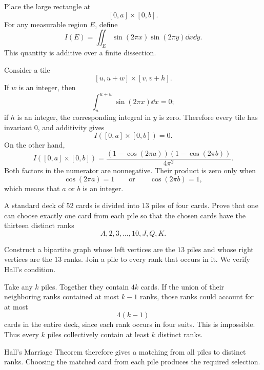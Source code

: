     \begin{solution}
        Place the large rectangle at
        \[
            [0,a]\times[0,b].
        \]
        For any measurable region $E$, define
        \[
            I(E)
            =
            \iint_E
            \sin(2\pi x)\sin(2\pi y)\dd x\dd y.
        \]
        This quantity is additive over a finite dissection.

        Consider a tile
        \[
            [u,u+w]\times[v,v+h].
        \]
        If $w$ is an integer, then
        \[
            \int_u^{u+w}\sin(2\pi x)\dd x=0;
        \]
        if $h$ is an integer, the corresponding integral in $y$ is zero.
        Therefore every tile has invariant $0$, and additivity gives
        \[
            I([0,a]\times[0,b])=0.
        \]
        On the other hand,
        \[
            I([0,a]\times[0,b])
            =
            \frac{(1-\cos(2\pi a))(1-\cos(2\pi b))}{4\pi^2}.
        \]
        Both factors in the numerator are nonnegative. Their product is zero
        only when
        \[
            \cos(2\pi a)=1
            \qquad\text{or}\qquad
            \cos(2\pi b)=1,
        \]
        which means that $a$ or $b$ is an integer.
    \end{solution}

    \begin{expectedproblem}
        A standard deck of $52$ cards is divided into $13$ piles of four cards.
        Prove that one can choose exactly one card from each pile so that the
        chosen cards have the thirteen distinct ranks
        \[
            A,2,3,\ldots,10,J,Q,K.
        \]
    \end{expectedproblem}

    \begin{solution}
        Construct a bipartite graph whose left vertices are the $13$ piles and
        whose right vertices are the $13$ ranks. Join a pile to every rank that
        occurs in it. We verify Hall's condition.

        Take any $k$ piles. Together they contain $4k$ cards. If the union of
        their neighboring ranks contained at most $k-1$ ranks, those ranks
        could account for at most
        \[
            4(k-1)
        \]
        cards in the entire deck, since each rank occurs in four suits. This is
        impossible. Thus every $k$ piles collectively contain at least $k$
        distinct ranks.

        Hall's Marriage Theorem therefore gives a matching from all piles to
        distinct ranks. Choosing the matched card from each pile produces the
        required selection.
    \end{solution}

